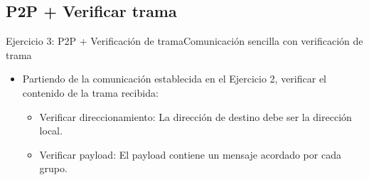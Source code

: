 \documentclass[aspectratio=169, handout]{beamer}
\begin{document}
\subsection[P2P+Verificar]{P2P + Verificar trama}
\begin{frame}[t]{Ejercicio 3: P2P + Verificación de trama}{Comunicación sencilla con verificación de trama}
    \begin{itemize}
        \item Partiendo de la comunicación establecida en el Ejercicio 2, verificar el contenido de la trama recibida:
        \vspace{5px}
            \begin{itemize}
            \item Verificar direccionamiento: La dirección de destino debe ser la dirección local.
            \vspace{5px}
            \item Verificar payload: El payload contiene un mensaje acordado por cada grupo.
            \vspace{5px}
            \end{itemize}
        \vspace{5px}
    \end{itemize}   
\end{frame}

\end{document}
